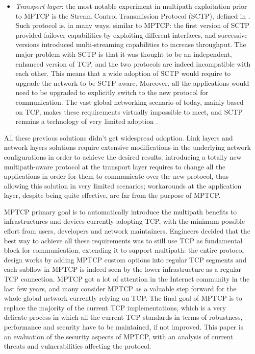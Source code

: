 \begin{itemize}
  \item \textit{Transport layer}: the most notable experiment in multipath exploitation prior to MPTCP is the Stream Control Transmission Protocol (SCTP), defined in . Such protocol is, in many ways, similar to MPTCP: the first version of SCTP provided failover capabilities by exploiting different interfaces, and successive versions introduced multi-streaming capabilities to increase throughput. The major problem with SCTP is that it was thought to be an independent, enhanced version of TCP, and the two protocols are indeed incompatible with each other. This means that a wide adoption of SCTP would require to upgrade the network to be SCTP aware. Moreover, all the applications would need to be upgraded to explicitly switch to the new protocol for communication. The vast global networking scenario of today, mainly based on TCP, makes these requirements virtually impossible to meet, and SCTP remains a technology of very limited adoption \cite{ipspace}.
\end{itemize}

All these previous solutions didn't get widespread adoption. Link layers and network layers solutions require extensive modifications in the underlying network configurations in order to achieve the desired results; introducing a totally new multipath-aware protocol at the transport layer requires to change all the applications in order for them to communicate over the new protocol, thus allowing this solution in very limited scenarios; workarounds at the application layer, despite being quite effective, are far from the purpose of MPTCP.

MPTCP primary goal is to automatically introduce the multipath benefits to infrastructures and devices currently adopting TCP, with the minimum possible effort from users, developers and network maintainers. Engineers decided that the best way to achieve all these requirements was to still use TCP as fundamental block for communication, extending it to support multipath: the entire protocol design works by adding MPTCP custom options into regular TCP segments and each subflow in MPTCP is indeed seen by the lower infrastructure as a regular TCP connection. 
MPTCP got a lot of attention in the Internet community in the last few years, and many consider MPTCP as a valuable step forward for the whole global network currently relying on TCP.
The final goal of MPTCP is to replace the majority of the current TCP implementations, which is a very delicate process in which all the current TCP standards in terms of robustness, performance and security have to be maintained, if not improved. This paper is an evaluation of the security aspects of MPTCP, with an analysis of current threats and vulnerabilities affecting the protocol.

